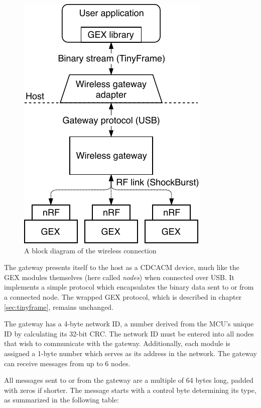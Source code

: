 \begin{figure}
	\vspace{-1em}
	\centering
	\includegraphics[scale=0.9]{img/rf-gw.pdf}
	\caption{A block diagram of the wireless connection}
\end{figure}

The gateway presents itself to the host as a \gls{CDCACM} device, much like the GEX modules themselves (here called \textit{nodes}) when connected over \gls{USB}. It implements a simple protocol which encapsulates the binary data sent to or from a connected node. The wrapped GEX protocol, which is described in chapter \ref{sec:tinyframe}, remains unchanged.

The gateway has a 4-byte network ID, a number derived from the \gls{MCU}'s unique ID by calculating its 32-bit \gls{CRC}. The network ID must be entered into all nodes that wish to communicate with the gateway. Additionally, each module is assigned a 1-byte number which serves as its address in the network. The gateway can receive messages from up to 6 nodes.

All messages sent to or from the gateway are a multiple of 64 bytes long, padded with zeros if shorter. The message starts with a control byte determining its type, as summarized in the following table:

